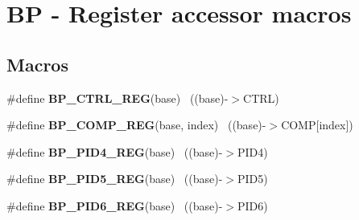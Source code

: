\hypertarget{group___b_p___register___accessor___macros}{}\section{B\+P -\/ Register accessor macros}
\label{group___b_p___register___accessor___macros}
\subsection*{Macros}
\begin{DoxyCompactItemize}
\item 
\hypertarget{group___b_p___register___accessor___macros_ga100429bf971494d180f9acfff3622bbc}{}\#define {\bfseries B\+P\+\_\+\+C\+T\+R\+L\+\_\+\+R\+E\+G}(base)                                            ~((base)-\/$>$C\+T\+R\+L)\label{group___b_p___register___accessor___macros_ga100429bf971494d180f9acfff3622bbc}

\item 
\hypertarget{group___b_p___register___accessor___macros_ga4efaa53ceb479c2ccba63e6f46db3859}{}\#define {\bfseries B\+P\+\_\+\+C\+O\+M\+P\+\_\+\+R\+E\+G}(base,  index)                                ~((base)-\/$>$C\+O\+M\+P\mbox{[}index\mbox{]})\label{group___b_p___register___accessor___macros_ga4efaa53ceb479c2ccba63e6f46db3859}

\item 
\hypertarget{group___b_p___register___accessor___macros_ga90e22b3ba62c6fe22d182b8e8a643b8e}{}\#define {\bfseries B\+P\+\_\+\+P\+I\+D4\+\_\+\+R\+E\+G}(base)                                            ~((base)-\/$>$P\+I\+D4)\label{group___b_p___register___accessor___macros_ga90e22b3ba62c6fe22d182b8e8a643b8e}

\item 
\hypertarget{group___b_p___register___accessor___macros_gaf8fb970b92294479554328432e7d385a}{}\#define {\bfseries B\+P\+\_\+\+P\+I\+D5\+\_\+\+R\+E\+G}(base)                                            ~((base)-\/$>$P\+I\+D5)\label{group___b_p___register___accessor___macros_gaf8fb970b92294479554328432e7d385a}

\item 
\hypertarget{group___b_p___register___accessor___macros_gabb82c5c71525eef38e8f1908ff271f2c}{}\#define {\bfseries B\+P\+\_\+\+P\+I\+D6\+\_\+\+R\+E\+G}(base)                                            ~((base)-\/$>$P\+I\+D6)\label{group___b_p___register___accessor___macros_gabb82c5c71525eef38e8f1908ff271f2c}


\end{DoxyCompactItemize}
